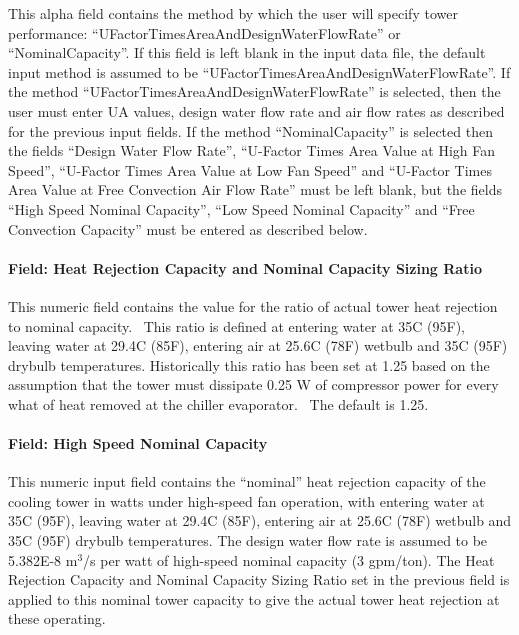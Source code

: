 This alpha field contains the method by which the user will specify tower performance: ``UFactorTimesAreaAndDesignWaterFlowRate'' or ``NominalCapacity''. If this field is left blank in the input data file, the default input method is assumed to be ``UFactorTimesAreaAndDesignWaterFlowRate''. If the method ``UFactorTimesAreaAndDesignWaterFlowRate'' is selected, then the user must enter UA values, design water flow rate and air flow rates as described for the previous input fields. If the method ``NominalCapacity'' is selected then the fields ``Design Water Flow Rate'', ``U-Factor Times Area Value at High Fan Speed'', ``U-Factor Times Area Value at Low Fan Speed'' and ``U-Factor Times Area Value at Free Convection Air Flow Rate'' must be left blank, but the fields ``High Speed Nominal Capacity'', ``Low Speed Nominal Capacity'' and ``Free Convection Capacity'' must be entered as described below.

\paragraph{Field: Heat Rejection Capacity and Nominal Capacity Sizing Ratio}\label{field-heat-rejection-capacity-and-nominal-capacity-sizing-ratio-1}

This numeric field contains the value for the ratio of actual tower heat rejection to nominal capacity.~ This ratio is defined at entering water at 35C (95F), leaving water at 29.4C (85F), entering air at 25.6C (78F) wetbulb and 35C (95F) drybulb temperatures. Historically this ratio has been set at 1.25 based on the assumption that the tower must dissipate 0.25 W of compressor power for every what of heat removed at the chiller evaporator.~ The default is 1.25.

\paragraph{Field: High Speed Nominal Capacity}\label{field-high-speed-nominal-capacity}

This numeric input field contains the ``nominal'' heat rejection capacity of the cooling tower in watts under high-speed fan operation, with entering water at 35C (95F), leaving water at 29.4C (85F), entering air at 25.6C (78F) wetbulb and 35C (95F) drybulb temperatures. The design water flow rate is assumed to be 5.382E-8 m\(^{3}\)/s per watt of high-speed nominal capacity (3 gpm/ton). The Heat Rejection Capacity and Nominal Capacity Sizing Ratio set in the previous field is applied to this nominal tower capacity to give the actual tower heat rejection at these operating.

